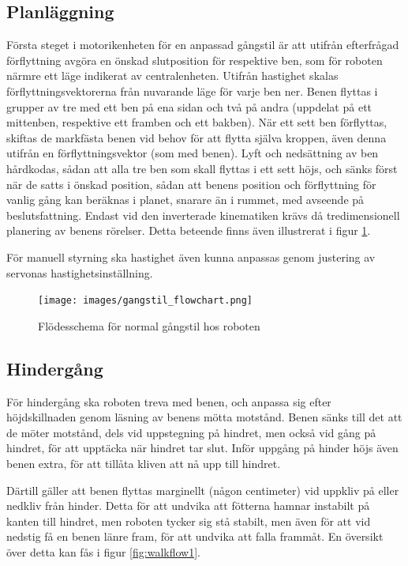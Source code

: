 \documentclass[a4paper,titlepage,12pt]{article}
\begin{document}
		\subsection{Planläggning}
	Första steget i motorikenheten för en anpassad gångstil är att utifrån efterfrågad
	förflyttning avgöra en önskad slutposition för respektive ben, som för roboten närmre 
	ett läge indikerat av centralenheten. Utifrån hastighet skalas förflyttningsvektorerna 
	från nuvarande läge för varje ben ner. Benen flyttas i grupper av tre med ett ben på 
	ena sidan och två på  andra (uppdelat på ett mittenben, respektive ett framben och ett 
	bakben). När ett sett ben förflyttas, skiftas de markfästa benen vid behov för 
	att flytta själva kroppen, även denna utifrån en förflyttningsvektor (som med benen). 
	Lyft och nedsättning av ben hårdkodas, sådan att alla tre ben som skall flyttas i ett 
	sett höjs, och sänks först när de satts i önskad position, sådan att benens position 
	och förflyttning för vanlig gång kan beräknas i planet, snarare än i rummet, med 
	avseende på beslutsfattning. Endast vid den inverterade kinematiken krävs då 
	tredimensionell planering av benens rörelser. Detta beteende finns även illustrerat i 
	figur \ref{fig:walkflow0}. 
	
	För manuell styrning ska hastighet även kunna anpassas genom justering av servonas
	hastighetsinställning.

	\begin{figure}[h]
		\centering
		\texttt{[image: images/gangstil\_flowchart.png]}
		\caption{Flödesschema för normal gångstil hos roboten \label{fig:walkflow0}}
	\end{figure}

	\subsection{Hindergång}
	För hindergång ska roboten treva med benen, och anpassa sig efter höjdskillnaden genom
	läsning av benens mötta motstånd. Benen sänks till det att de möter motstånd, dels
	vid uppstegning på hindret, men också vid gång på hindret, för att upptäcka när hindret 
	tar slut. Inför uppgång på hinder höjs även benen extra, för att tillåta kliven att nå 
	upp till hindret.

	Därtill gäller att benen flyttas marginellt (någon centimeter) vid uppkliv på eller 
	nedkliv från hinder. Detta för att undvika att fötterna hamnar instabilt på kanten till 
	hindret, men roboten tycker sig stå stabilt, men även för att vid nedstig få en benen 
	länre fram, för att undvika att falla frammåt. En översikt över detta kan fås i figur \ref{fig:walkflow1}.
\end{document}
